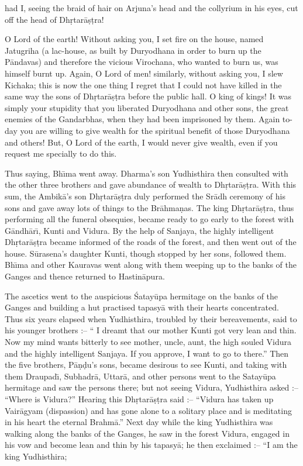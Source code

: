 had I, seeing the braid of hair on Arjuna's head and the collyrium in his eyes, cut off the head of Dh\d{r}tar\=a\d{s}\d{t}ra!

O Lord of the earth! Without asking you, I set fire on the house, named Jatugriha (a lac-house, as built by Duryodhana in order to burn up the P\=andavas) and therefore the vicious Virochana, who wanted to burn us, was himself burnt up. Again, O Lord of men! similarly, without asking you, I slew Kichaka; this is now the one thing I regret that I could not have killed in the same way the sons of Dh\d{r}tar\=a\d{s}\d{t}ra before the public hall. O king of kings! It was simply your stupidity that you liberated Duryodhana and other sons, the great enemies of the Gandarbhas, when they had been imprisoned by them. Again to-day you are willing to give wealth for the spiritual benefit of those Duryodhana and others! But, O Lord of the earth, I would never give wealth, even if you request me specially to do this.

Thus saying, Bh\={\i}ma went away. Dharma's son Yudhisthira then consulted with the other three brothers and gave abundance of wealth to Dh\d{r}tar\=a\d{s}\d{t}ra. With this sum, the Ambik\=a's son Dh\d{r}tar\=a\d{s}\d{t}ra duly performed the Sr\=adh ceremony of his sons and gave away lots of things to the Br\=ahma\d{n}as. The king Dh\d{r}tar\=a\d{s}\d{t}ra, thus performing all the funeral obsequies, became ready to go early to the forest with G\=andh\=ar\={\i}, Kunti and Vidura. By the help of Sanjaya, the highly intelligent Dh\d{r}tar\=a\d{s}\d{t}ra became informed of the roads of the forest, and then went out of the house. S\=urasena's daughter Kunti, though stopped by her sons, followed them. Bh\={\i}ma and other Kauravas went along with them weeping up to the banks of the Ganges and thence returned to Hastin\=apura.

The ascetics went to the auspicious \'Satay\=upa hermitage on the banks of the Ganges and building a hut practised tapasy\=a with their hearts concentrated. Thus six years elapsed when Yudhisthira, troubled by their bereavements, said to his younger brothers :-- `` I dreamt that our mother Kunti got very lean and thin. Now my mind wants bitterly to see mother, uncle, aunt, the high souled Vidura and the highly intelligent Sanjaya. If you approve, I want to go to there.'' Then the five brothers, P\=a\d{n}\d{d}u's sons, became desirous to see Kunti, and taking with them Draupad\={\i}, Subhadr\=a, Uttar\=a, and other persons went to the Satay\=upa hermitage and saw the persons there; but not seeing Vidura, Yudhisthira asked :-- ``Where is Vidura?'' Hearing this Dh\d{r}tar\=a\d{s}\d{t}ra said :-- ``Vidura has taken up Vair\=agyam (dispassion) and has gone alone to a solitary place and is meditating in his heart the eternal Brahm\=a.'' Next day while the king Yudhisthira was walking along the banks of the Ganges, he saw in the forest Vidura, engaged in his vow and become lean and thin by his tapasy\=a; he then exclaimed :-- ``I am the king Yudhisthira;


